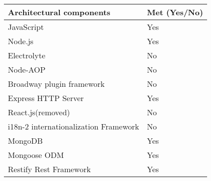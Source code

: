 \begin{tabular}{|l|l|}
\hline
Architectural components & Met (Yes/No)\\
\hline
JavaScript & Yes \\
Node.js & Yes\\	
Electrolyte & No\\
Node-AOP & No\\
Broadway plugin framework & No\\
Express HTTP Server & Yes\\
React.js(removed) & No\\
i18n-2 internationalization Framework & No\\
MongoDB & Yes\\
Mongoose ODM & Yes\\
Restify Rest Framework & Yes\\
\hline
\end{tabular}
